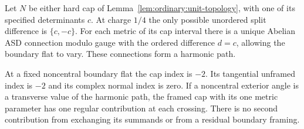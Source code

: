 \begin{lemma}
\label{lem:ordinary:harmonic-caps}
Let $N$ be either hard cap of
Lemma~\ref{lem:ordinary:unit-topology}, with one of its specified
determinants $c$.  At charge $1/4$ the only possible unordered
split difference is $\{c,-c\}$.  For each metric of its cap
interval there is a unique Abelian ASD connection modulo gauge
with the ordered difference $d=c$, allowing the boundary flat
to vary.  These connections form a harmonic path.

At a fixed noncentral boundary flat the cap index is $-2$.
Its tangential unframed index is $-2$ and its complex normal
index is zero.  If a noncentral exterior angle is a transverse
value of the harmonic path, the framed cap with its one metric
parameter has one regular contribution at each crossing.
There is no second contribution from exchanging its summands
or from a residual boundary framing.
\end{lemma}
